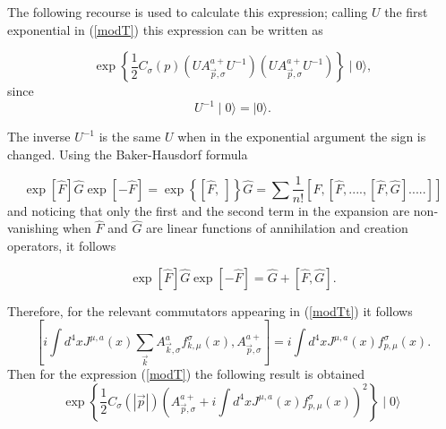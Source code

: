 \documentclass[12pt,letterpaper]{report}
\begin{document}
The following recourse is used to calculate this expression;
calling $U$ the first exponential in (\ref{modT}) this expression
can be written as

\begin{equation}
\exp \left\{ \frac 12C_\sigma\left(p\right) \left(
UA_{\vec{p},\sigma }^{a+}U^{-1}\right) \left(UA_{\vec{p},\sigma
}^{a+}U^{-1}\right) \right\} \mid 0\rangle, \label{modTt}
\end{equation}
since
\[
U^{-1}\mid 0\rangle =\mid 0\rangle.
\]

The inverse $U^{-1}$ is the same $U$ when in the exponential
argument the sign is changed. Using the Baker-Hausdorf formula

\[
\exp [\hat{F}]\hat{G}\exp [-\hat{F}]=\exp \left\{ [\hat{F},\
]\right\} \hat{G }=\sum \frac 1{n!}\left[ \hat{F},\left[
\hat{F},....,\left[ \hat{F},\hat{G} \right].....\right] \right]
\]
and noticing that only the first and the second term in the
expansion are non-vanishing when $\hat{F}$ and $\hat{G}$ are
linear functions of annihilation and creation operators, it
follows

\[
\exp [\hat{F}]\hat{G}\exp [-\hat{F}]=\hat{G}+\left[
\hat{F},\hat{G}\right].
\]

Therefore, for the relevant commutators appearing in (\ref{modTt})
it follows
\[
\left[ i\int d^4xJ^{\mu,a}\left(x\right)
\sum\limits_{\vec{k}}A_{\vec{k},\sigma }^af_{k,\mu }^\sigma \left(
x\right),A_{\vec{p},\sigma }^{a+}\right] =i\int d^4xJ^{\mu
,a}\left(x\right) f_{p,\mu }^\sigma \left(x\right).
\]
Then for the expression (\ref{modT}) the following result is
obtained
\begin{equation}
\exp \left\{ \frac 12C_\sigma \left(\left| \vec{p}\right| \right)
\left(A_{ \vec{p},\sigma }^{a+}+i\int d^4xJ^{\mu,a}\left(x\right)
f_{p,\mu }^\sigma \left(x\right) \right) ^2\right\} \mid 0\rangle
\ \label{T}
\end{equation}
\end{document}
